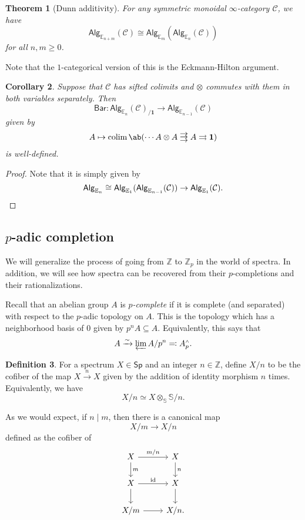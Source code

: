 \documentclass[10pt, oneside]{memoir}
\newtheorem{thm}{Theorem}[subsection]
\newtheorem{cor}[thm]{Corollary}
\theoremstyle{definition}
\newtheorem{defn}[thm]{Definition}
\theoremstyle{remark}
\theoremstyle{plain}
\theoremstyle{definition}
\theoremstyle{remark}
\newcommand{\Z}{\mathbb{Z}}
\newcommand{\E}{\mathbb{E}}
\newcommand{\bS}{\mathbb{S}}
\newcommand{\mc}[1]{\mathcal{#1}}
\newcommand{\mr}[1]{\mathrm{#1}}
\newcommand{\ms}[1]{\mathsf{#1}}
\newcommand{\1}{\mathbf{1}}
\newcommand{\2}{\mathbf{2}}
\newcommand{\3}{\mathbf{3}}
\newcommand{\sw}{\mathsmaller{\wedge}}
\newcommand*{\triple}[2][.1ex]{%
    \mathrel{\vcenter{\offinterlineskip%
    \hbox{$#2$}\vskip#1\hbox{$#2$}\vskip#1\hbox{$#2$}}}}
\DeclareMathOperator*{\colim}{colim}
\begin{document}
\begin{thm}[Dunn additivity]\label{thm:dunnadditivity}
    For any symmetric monoidal $\infty$-category $\mc{C}$, we have
    \[ \ms{Alg}_{\E_{n+m}}(\mc{C}) \cong \ms{Alg}_{\E_m}(\ms{Alg}_{\E_n}(\mc{C})) \]
    for all $n, m \geq 0$.
\end{thm}

Note that the $1$-categorical version of this is the Eckmann-Hilton argument.

\begin{cor}
    Suppose that $\mc{C}$ has sifted colimits and $\otimes$ commutes with them in both variables separately. Then
    \[ \ms{Bar} \colon \ms{Alg}_{\E_n}(\mc{C})_{/\1} \to \ms{Alg}_{\E_{n-1}}(\mc{C}) \]
    given by 
    \[ A \mapsto \colim \ab(\cdots A \otimes A \triple{\to} A \rightrightarrows \1) \]
    is well-defined.
\end{cor}

\begin{proof}
    Note that it is simply given by
    \[ \ms{Alg}_{\E_n} \cong \ms{Alg}_{\E_1} (\ms{Alg}_{\E_{n-1}}(\mc{C})) \to \ms{Alg}_{\E_1}(\mc{C}). \qedhere \]
\end{proof}

\subsection{$p$-adic completion}%
\label{sub:p-adic completion}

We will generalize the process of going from $\Z$ to $\Z_p$ in the world of spectra. In addition, we will see how spectra can be recovered from their $p$-completions and their rationalizations.

Recall that an abelian group $A$ is \textit{$p$-complete} if it is complete (and separated) with respect to the $p$-adic topology on $A$. This is the topology which has a neighborhood basis of $0$ given by $p^n A \subseteq A$. Equivalently, this says that
\[ A \xrightarrow{\sim} \varprojlim A/p^n \eqqcolon A^{\sw}_p. \]

\begin{defn}
    For a spectrum $X \in \ms{Sp}$ and an integer $n \in \Z$, define $X/n$ to be the cofiber of the map $X \xrightarrow{n} X$ given by the addition of identity morphism $n$ times. Equivalently, we have
    \[ X/n \simeq X \otimes_{\bS} \bS/n. \]
\end{defn}

As we would expect, if $n \mid m$, then there is a canonical map
\[ X/m \to X/n \] defined as the cofiber of
\begin{equation*}
\begin{tikzcd}
    X \ar{d}{m} \ar{r}{m/n} & X \ar{d}{n} \\
    X \ar{r}{\mr{id}} \ar{d} & X \ar{d} \\
    X/m \ar{r} & X/n.
\end{tikzcd}
\end{equation*}
\end{document}
